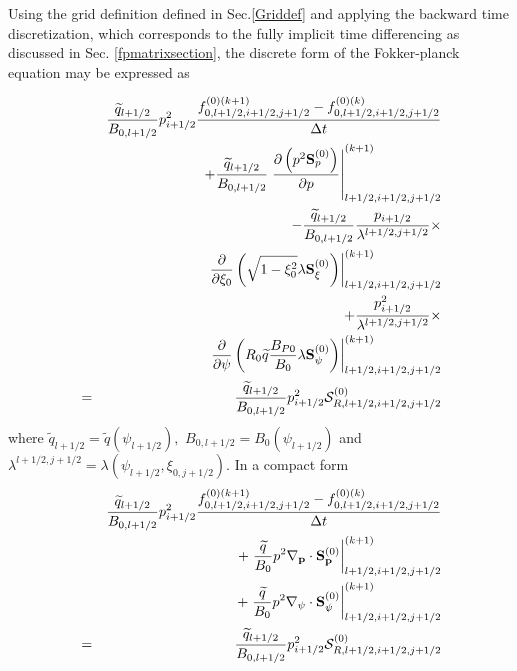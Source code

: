 Using the grid definition defined in Sec.\ref{Griddef} and applying the
backward time discretization, which corresponds to the fully implicit time
differencing as discussed in Sec. \ref{fpmatrixsection}, the discrete form
of the Fokker-planck equation may be expressed as

\begin{eqnarray}
&&\frac{\widetilde{q}_{l+1/2}}{B_{0,l+1/2}}p_{i+1/2}^{2}\frac{%
f_{0,l+1/2,i+1/2,j+1/2}^{\left( 0\right)
(k+1)}-f_{0,l+1/2,i+1/2,j+1/2}^{\left( 0\right) (k)}}{\Delta t}  \nonumber \\
&&+\frac{\widetilde{q}_{l+1/2}}{B_{0,l+1/2}}\left. \frac{\partial \left(
p^{2}\mathbf{S}_{p}^{\left( 0\right) }\right) }{\partial p}\right|
_{l+1/2,i+1/2,j+1/2}^{(k+1)}  \nonumber \\
&&-\frac{\widetilde{q}_{l+1/2}}{B_{0,l+1/2}}\frac{p_{i+1/2}}{\lambda
^{l+1/2,j+1/2}}\times   \nonumber \\
&&\left. \frac{\partial }{\partial \xi _{0}}\left( \sqrt{1-\xi _{0}^{2}}%
\lambda \mathbf{S}_{\xi }^{\left( 0\right) }\right) \right|
_{l+1/2,i+1/2,j+1/2}^{(k+1)}  \nonumber \\
&&+\frac{p_{i+1/2}^{2}}{\lambda ^{l+1/2,j+1/2}}\times   \nonumber \\
&&\left. \frac{\partial }{\partial \psi }\left( R_{0}\widetilde{q}\frac{%
B_{P0}}{B_{0}}\lambda \mathbf{S}_{\psi }^{\left( 0\right) }\right) \right|
_{l+1/2,i+1/2,j+1/2}^{(k+1)}  \nonumber \\
&=&\frac{\widetilde{q}_{l+1/2}}{B_{0,l+1/2}}p_{i+1/2}^{2}\mathcal{S}%
_{R,l+1/2,i+1/2,j+1/2}^{\left( 0\right) }
\end{eqnarray}
where $\widetilde{q}_{l+1/2}=\widetilde{q}\left( \psi _{l+1/2}\right) ,$ $%
B_{0,l+1/2}=B_{0}\left( \psi _{l+1/2}\right) $ and $\lambda
^{l+1/2,j+1/2}=\lambda \left( \psi _{l+1/2},\xi _{0,j+1/2}\right) .$ In a
compact form
\begin{eqnarray}
&&\frac{\widetilde{q}_{l+1/2}}{B_{0,l+1/2}}p_{i+1/2}^{2}\frac{%
f_{0,l+1/2,i+1/2,j+1/2}^{\left( 0\right)
(k+1)}-f_{0,l+1/2,i+1/2,j+1/2}^{\left( 0\right) (k)}}{\Delta t}  \nonumber \\
&&+\left. \frac{\widetilde{q}}{B_{0}}p^{2}\nabla _{\mathbf{p}}\cdot \mathbf{S%
}_{\mathbf{p}}^{\left( 0\right) }\right| _{l+1/2,i+1/2,j+1/2}^{(k+1)}
\nonumber \\
&&+\left. \frac{\widetilde{q}}{B_{0}}p^{2}\nabla _{\psi }\cdot \mathbf{S}%
_{\psi }^{\left( 0\right) }\right| _{l+1/2,i+1/2,j+1/2}^{(k+1)}  \nonumber \\
&=&\frac{\widetilde{q}_{l+1/2}}{B_{0,l+1/2}}p_{i+1/2}^{2}\mathcal{S}%
_{R,l+1/2,i+1/2,j+1/2}^{\left( 0\right) }
\end{eqnarray}
